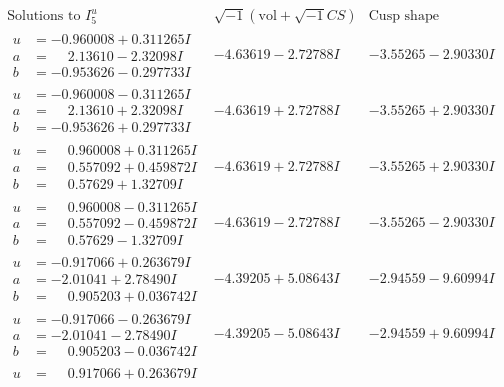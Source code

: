 \documentclass[1p]{elsarticle_modified}
\theoremstyle{definition}
\newcommand{\I}{\sqrt{-1}}
\begin{document}
$$\begin{array}{c|c|c}  
\text{Solutions to }I^u_{5}& \I (\text{vol} + \sqrt{-1}CS) & \text{Cusp shape}\\
 \hline 
\begin{aligned}
u &= -0.960008 + 0.311265 I \\
a &= \phantom{-}2.13610 - 2.32098 I \\
b &= -0.953626 - 0.297733 I\end{aligned}
 & -4.63619 - 2.72788 I & -3.55265 - 2.90330 I \\ \hline\begin{aligned}
u &= -0.960008 - 0.311265 I \\
a &= \phantom{-}2.13610 + 2.32098 I \\
b &= -0.953626 + 0.297733 I\end{aligned}
 & -4.63619 + 2.72788 I & -3.55265 + 2.90330 I \\ \hline\begin{aligned}
u &= \phantom{-}0.960008 + 0.311265 I \\
a &= \phantom{-}0.557092 + 0.459872 I \\
b &= \phantom{-}0.57629 + 1.32709 I\end{aligned}
 & -4.63619 + 2.72788 I & -3.55265 + 2.90330 I \\ \hline\begin{aligned}
u &= \phantom{-}0.960008 - 0.311265 I \\
a &= \phantom{-}0.557092 - 0.459872 I \\
b &= \phantom{-}0.57629 - 1.32709 I\end{aligned}
 & -4.63619 - 2.72788 I & -3.55265 - 2.90330 I \\ \hline\begin{aligned}
u &= -0.917066 + 0.263679 I \\
a &= -2.01041 + 2.78490 I \\
b &= \phantom{-}0.905203 + 0.036742 I\end{aligned}
 & -4.39205 + 5.08643 I & -2.94559 - 9.60994 I \\ \hline\begin{aligned}
u &= -0.917066 - 0.263679 I \\
a &= -2.01041 - 2.78490 I \\
b &= \phantom{-}0.905203 - 0.036742 I\end{aligned}
 & -4.39205 - 5.08643 I & -2.94559 + 9.60994 I \\ \hline\begin{aligned}
u &= \phantom{-}0.917066 + 0.263679 I \\

\end{aligned}
\end{array}$$
\end{document}
